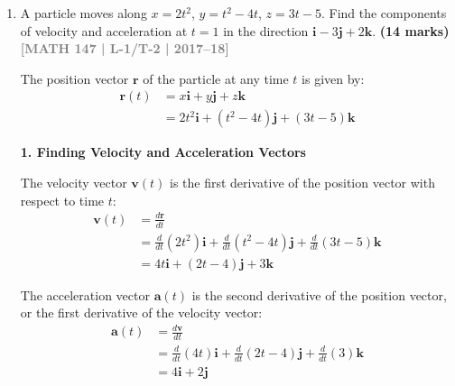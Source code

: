 \documentclass[12pt,a4paper]{article}
\newcommand{\yr}[1]{\hfill\textcolor{gray}{\small\textbf{[#1]}}}
\newcommand{\mk}[1]{\textcolor{orange!70!black}{\small\textbf{(#1 marks)}}}
\begin{document}
\begin{enumerate}
\begin{tcolorbox}[enhanced,breakable,ansbox,colback=cD!4,colframe=cD,boxrule=0.8pt,arc=5pt,title={\textbf{Answer}},fonttitle=\bfseries\color{white},colbacktitle=cD]
Now, divide the tangent vector by its magnitude to find the unit tangent vector:
\begin{align*}
    \hat{\mathbf{T}}(2) &= \frac{\mathbf{v}(2)}{|\mathbf{v}(2)|} \\
    &= \frac{1}{6} (4\mathbf{i} + 4\mathbf{j} + 2\mathbf{k}) \\
    &= \frac{4}{6}\mathbf{i} + \frac{4}{6}\mathbf{j} + \frac{2}{6}\mathbf{k} \\
    &= \boxed{\frac{2}{3}\mathbf{i} + \frac{2}{3}\mathbf{j} + \frac{1}{3}\mathbf{k}}
\end{align*}

\end{tcolorbox}

\item A particle moves along $x=2t^{2}$, $y=t^{2}-4t$, $z=3t-5$. Find the components of velocity and acceleration at $t=1$ in the direction $\mathbf{i}-3\mathbf{j}+2\mathbf{k}$.
\mk{14} \yr{MATH 147 | L-1/T-2 | 2017--18}

\begin{tcolorbox}[enhanced,breakable,ansbox,colback=cD!4,colframe=cD,boxrule=0.8pt,arc=5pt,title={\textbf{Answer}},fonttitle=\bfseries\color{white},colbacktitle=cD]

The position vector $\mathbf{r}$ of the particle at any time $t$ is given by:
\begin{align*}
    \mathbf{r}(t) &= x\mathbf{i} + y\mathbf{j} + z\mathbf{k} \\
    &= 2t^2\mathbf{i} + (t^2 - 4t)\mathbf{j} + (3t - 5)\mathbf{k}
\end{align*}

\textbf{1. Finding Velocity and Acceleration Vectors}

The velocity vector $\mathbf{v}(t)$ is the first derivative of the position vector with respect to time $t$:
\begin{align*}
    \mathbf{v}(t) &= \frac{d\mathbf{r}}{dt} \\
    &= \frac{d}{dt}(2t^2)\mathbf{i} + \frac{d}{dt}(t^2 - 4t)\mathbf{j} + \frac{d}{dt}(3t - 5)\mathbf{k} \\
    &= 4t\mathbf{i} + (2t - 4)\mathbf{j} + 3\mathbf{k}
\end{align*}

The acceleration vector $\mathbf{a}(t)$ is the second derivative of the position vector, or the first derivative of the velocity vector:
\begin{align*}
    \mathbf{a}(t) &= \frac{d\mathbf{v}}{dt} \\
    &= \frac{d}{dt}(4t)\mathbf{i} + \frac{d}{dt}(2t - 4)\mathbf{j} + \frac{d}{dt}(3)\mathbf{k} \\
    &= 4\mathbf{i} + 2\mathbf{j}
\end{align*}


\end{tcolorbox}
\end{enumerate}
\end{document}
